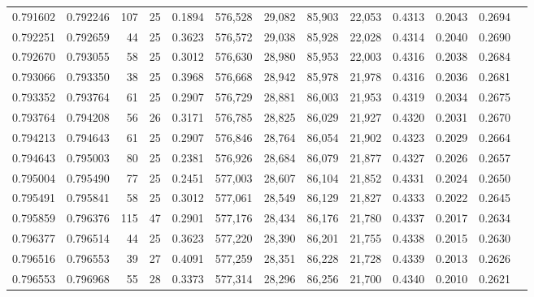 \begin{tabular}{rrrrrrrrrrrrr}
0.791602 & 0.792246 &   107 &  25 &                                     0.1894 & 576,528 &  29,082 &  85,903 &  22,053 & 0.4313 & 0.2043 & 0.2694 \\
0.792251 & 0.792659 &    44 &  25 &                                     0.3623 & 576,572 &  29,038 &  85,928 &  22,028 & 0.4314 & 0.2040 & 0.2690 \\
0.792670 & 0.793055 &    58 &  25 &                                     0.3012 & 576,630 &  28,980 &  85,953 &  22,003 & 0.4316 & 0.2038 & 0.2684 \\
0.793066 & 0.793350 &    38 &  25 &                                     0.3968 & 576,668 &  28,942 &  85,978 &  21,978 & 0.4316 & 0.2036 & 0.2681 \\
0.793352 & 0.793764 &    61 &  25 &                                     0.2907 & 576,729 &  28,881 &  86,003 &  21,953 & 0.4319 & 0.2034 & 0.2675 \\
0.793764 & 0.794208 &    56 &  26 &                                     0.3171 & 576,785 &  28,825 &  86,029 &  21,927 & 0.4320 & 0.2031 & 0.2670 \\
0.794213 & 0.794643 &    61 &  25 &                                     0.2907 & 576,846 &  28,764 &  86,054 &  21,902 & 0.4323 & 0.2029 & 0.2664 \\
0.794643 & 0.795003 &    80 &  25 &                                     0.2381 & 576,926 &  28,684 &  86,079 &  21,877 & 0.4327 & 0.2026 & 0.2657 \\
0.795004 & 0.795490 &    77 &  25 &                                     0.2451 & 577,003 &  28,607 &  86,104 &  21,852 & 0.4331 & 0.2024 & 0.2650 \\
0.795491 & 0.795841 &    58 &  25 &                                     0.3012 & 577,061 &  28,549 &  86,129 &  21,827 & 0.4333 & 0.2022 & 0.2645 \\
0.795859 & 0.796376 &   115 &  47 &                                     0.2901 & 577,176 &  28,434 &  86,176 &  21,780 & 0.4337 & 0.2017 & 0.2634 \\
0.796377 & 0.796514 &    44 &  25 &                                     0.3623 & 577,220 &  28,390 &  86,201 &  21,755 & 0.4338 & 0.2015 & 0.2630 \\
0.796516 & 0.796553 &    39 &  27 &                                     0.4091 & 577,259 &  28,351 &  86,228 &  21,728 & 0.4339 & 0.2013 & 0.2626 \\
0.796553 & 0.796968 &    55 &  28 &                                     0.3373 & 577,314 &  28,296 &  86,256 &  21,700 & 0.4340 & 0.2010 & 0.2621 \\

\end{tabular}
